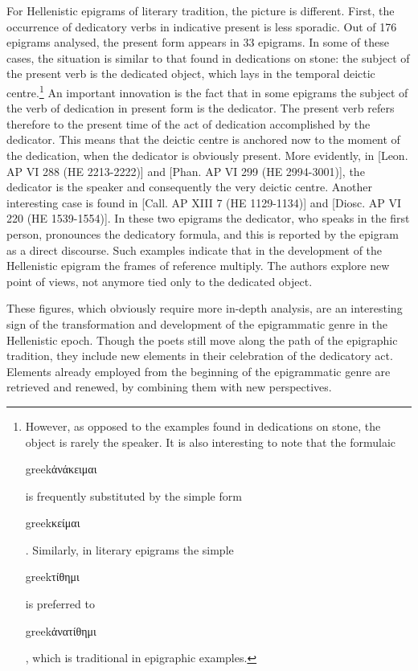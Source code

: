 \documentclass[amsthm,ebook]{saparticle}
\begin{document}
For Hellenistic epigrams of literary tradition, the picture is different. First, the occurrence of dedicatory verbs in
indicative present is less sporadic. Out of 176 epigrams analysed, the present form appears in 33 epigrams. In some of
these cases, the situation is similar to that found in dedications on stone: the subject of the present verb is the
dedicated object, which lays in the temporal deictic centre.\footnote{ However, as opposed to the examples found in
dedications on stone, the object is rarely the speaker. It is also interesting to note that the formulaic
\begin{otherlanguage*}{greek}ἀνάκειμαι\end{otherlanguage*} is frequently substituted by the simple form \begin{otherlanguage*}{greek}κείμαι\end{otherlanguage*}. Similarly, in literary
epigrams the simple \begin{otherlanguage*}{greek}τίθημι\end{otherlanguage*} is preferred to \begin{otherlanguage*}{greek}ἀνατίθημι\end{otherlanguage*}, which is traditional in epigraphic
examples.} An important innovation is the fact that in some epigrams the subject of the verb of dedication in present
form is the dedicator. The present verb refers therefore to the present time of the act of dedication accomplished by
the dedicator. This means that the deictic centre is anchored now to the moment of the dedication, when the dedicator
is obviously present. More evidently, in [Leon. AP VI 288 (HE 2213-2222)] and [Phan. AP VI 299 (HE 2994-3001)], the
dedicator is the speaker and consequently the very deictic centre. Another interesting case is found in [Call. AP XIII
7 (HE 1129-1134)] and [Diosc. AP VI 220 (HE 1539-1554)]. In these two epigrams the dedicator, who speaks in the first
person, pronounces the dedicatory formula, and this is reported by the epigram as a direct discourse. Such examples
indicate that in the development of the Hellenistic epigram the frames of reference multiply. The authors explore new
point of views, not anymore tied only to the dedicated object.

These figures, which obviously require more in-depth analysis, are an interesting sign of the transformation and
development of the epigrammatic genre in the Hellenistic epoch. Though the poets still move along the path of the
epigraphic tradition, they include new elements in their celebration of the dedicatory act. Elements already employed
from the beginning of the epigrammatic genre are retrieved and renewed, by combining them with new perspectives. 
\end{document}
